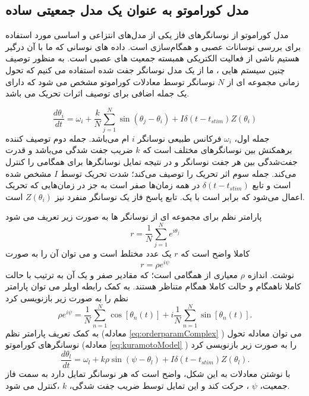 \subsection{ مدل کوراموتو به عنوان یک مدل جمعیتی ساده  }

مدل کوراموتو از نوسانگرهای فاز یکی از مدل‌های انتزاعی و اساسی مورد استفاده برای بررسی نوسانات عصبی و همگام‌سازی است.
داده های نوسانی که ما با آن درگیر هستیم ناشی از فعالیت الکتریکی همبسته جمعیت های عصبی است.
به منظور توصیف چنین سیستم هایی ، ما از یک مدل نوسانگر جفت شده استفاده می کنیم که تحول زمانی مجموعه ای از 
$N$
نوسانگر توسط معادلات کوراموتو مشخص می شود که دارای یک جمله اضافی برای توصیف اثرات تحریک می باشد.

\begin{equation}
    \frac{d \theta_i}{dt} = \omega_i + \frac{k}{N} \sum_{j=1}^{N} \sin(\theta_j -\theta_i) + I \delta(t-t_{stim}) Z(\theta_i)
    \label{eq:kuramotoModel}
\end{equation}
جمله اول، 
$\omega_i$
فرکانس طبیعی نوسانگر 
$i$ 
ام می‌باشد.
جمله دوم توصیف کننده برهمکنش بین نوسانگرهای مختلف است که 
$k$
ضریب جفت شدگی می‌باشد و قدرت جفت‌شدگی بین هر جفت نوسانگر و در نتیجه تمایل نوسانگرها برای همگامی را کنترل می‌کند. 
جمله سوم اثر تحریک را توصیف می‌کند؛ شدت تحریک توسط 
$I$
مشخص شده است و تابع 
$\delta(t-t_{stim})$
در همه زمان‌ها صفر است به جز در زمان‌هایی که تحریک اعمال می‌شود که برابر است با یک.
تابع پاسخ فاز یک نوسانگر منفرد نیز
$Z(\theta_i)$
است.

پارامتر نظم برای مجموعه ای از نوسانگر ها به صورت زیر تعریف می شود
\begin{equation}
    r=\frac{1}{N} \sum_{j=1}^{N} e^{i \theta_j}
    \label{eq:orderParam}
\end{equation}
کاملا واضح است که 
$r$
یک عدد مختلط است و می توان آن را به صورت 
\begin{equation}
    r=\rho e^{i \psi}
    \label{eq:orderparamComplex}
\end{equation}
نوشت. 
اندازه 
$\rho$
معیاری از همگامی است؛ که مقادیر صفر و یک آن به ترتیب با حالت کاملا ناهمگام و حالت کاملا همگام متناظر هستند. به کمک رابطه اویلر می توان پارامتر نظم را به صورت زیر بازنویسی کرد
\begin{equation}
    \rho e^{i \psi} = \frac{1}{N} \sum_{n=1}^{N} \cos [\theta_n(t)] + i \frac{1}{N} \sum_{n=1}^{N} \sin [\theta_n(t)].
    \label{eq:orderParamExpansion}
\end{equation}
به کمک تعریف پارامتر نظم (معادله
\ref{eq:orderparamComplex}
)
می توان معادله تحول نوسانگرهای کوراموتو (معادله
\ref{eq:kuramotoModel}
)
را به صورت زیر بازنویسی کرد
\begin{equation}
      \frac{d \theta_l}{dt} = \omega _l + k \rho \sin ( \psi - \theta_l) + I \delta(t-t_{stim}) Z(\theta_l).
\end{equation}
با نوشتن معادلات به این شکل، واضح است که هر نوسانگر تمایل دارد به سمت فاز جمعیت،
$\psi$
، حرکت کند و این تمایل توسط ضریب جفت شدگی، 
$k$
،کنترل می شود.


